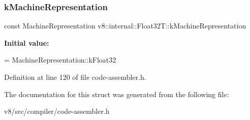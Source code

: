 \subsubsection{\texorpdfstring{k\+Machine\+Representation}{kMachineRepresentation}}
{\footnotesize\ttfamily const Machine\+Representation v8\+::internal\+::\+Float32\+T\+::k\+Machine\+Representation\hspace{0.3cm}{\ttfamily [static]}}

{\bfseries Initial value\+:}
\begin{DoxyCode}
=
      MachineRepresentation::kFloat32
\end{DoxyCode}


Definition at line 120 of file code-\/assembler.\+h.



The documentation for this struct was generated from the following file\+:\begin{DoxyCompactItemize}
\item 
v8/src/compiler/code-\/assembler.\+h\end{DoxyCompactItemize}
